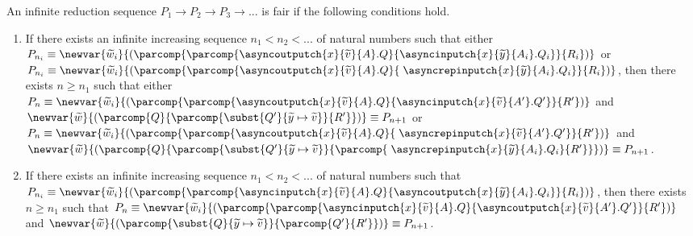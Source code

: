 \begin{defi}
    An infinite reduction sequence $P_1 \longrightarrow P_2 \longrightarrow P_3 \longrightarrow ...$ is fair if the following conditions hold.
    \begin{enumerate}%
        \item If there exists an infinite increasing sequence $n_1 < n_2 < ...$ of natural numbers such that either $P_{n_i} \equiv \newvar{\widetilde{w}_i}{(\parcomp{\parcomp{\asyncoutputch{x}{\widetilde{v}}{A}.Q}{\asyncinputch{x}{\widetilde{y}}{A_i}.Q_i}}{R_i})}$ or $P_{n_i} \equiv \newvar{\widetilde{w}_i}{(\parcomp{\parcomp{\asyncoutputch{x}{\widetilde{v}}{A}.Q}{\;\asyncrepinputch{x}{\widetilde{y}}{A_i}.Q_i}}{R_i})}$, then there exists $n \geq n_1$ such that either $P_n \equiv \newvar{\widetilde{w}_i}{(\parcomp{\parcomp{\asyncoutputch{x}{\widetilde{v}}{A}.Q}{\asyncinputch{x}{\widetilde{v}}{A'}.Q'}}{R'})}$ and $\newvar{\widetilde{w}}{(\parcomp{Q}{\parcomp{\subst{Q'}{\widetilde{y} \mapsto \widetilde{v}}}{R'}})} \equiv P_{n+1}$ or $P_n \equiv \newvar{\widetilde{w}_i}{(\parcomp{\parcomp{\asyncoutputch{x}{\widetilde{v}}{A}.Q}{\;\asyncrepinputch{x}{\widetilde{v}}{A'}.Q'}}{R'})}$ and $\newvar{\widetilde{w}}{(\parcomp{Q}{\parcomp{\subst{Q'}{\widetilde{y} \mapsto \widetilde{v}}}{\parcomp{\;\asyncrepinputch{x}{\widetilde{y}}{A_i}.Q_i}{R'}}})} \equiv P_{n+1}$.
        
        \item If there exists an infinite increasing sequence $n_1 < n_2 < ...$ of natural numbers such that $P_{n_i} \equiv \newvar{\widetilde{w}_i}{(\parcomp{\parcomp{\asyncinputch{x}{\widetilde{v}}{A}.Q}{\asyncoutputch{x}{\widetilde{y}}{A_i}.Q_i}}{R_i})}$, then there exists $n \geq n_1$ such that $P_n \equiv \newvar{\widetilde{w}_i}{(\parcomp{\parcomp{\asyncinputch{x}{\widetilde{v}}{A}.Q}{\asyncoutputch{x}{\widetilde{v}}{A'}.Q'}}{R'})}$ and $\newvar{\widetilde{w}}{(\parcomp{\subst{Q}{\widetilde{y} \mapsto \widetilde{v}}}{\parcomp{Q'}{R'}})} \equiv P_{n+1}$.
        
        

\end{enumerate}
\end{defi}
